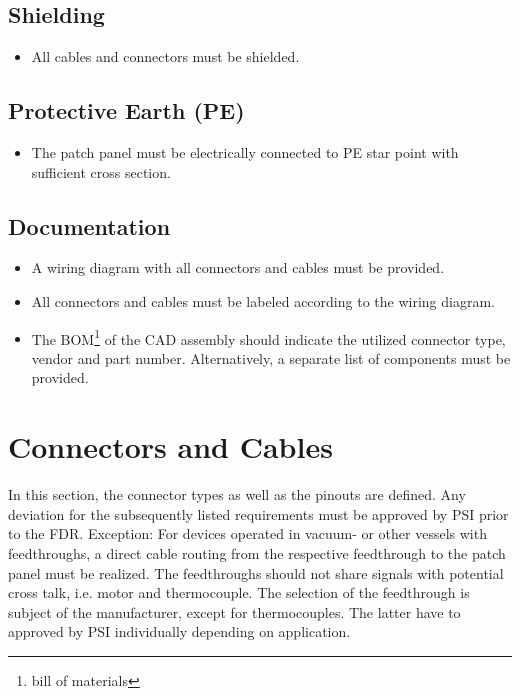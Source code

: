 \documentclass[english]{psi_easy}
\begin{document}
\subsection{Shielding}
\begin{itemize}
    \item All cables and connectors must be shielded.
\end{itemize}

\subsection{Protective Earth (PE)}
\begin{itemize}
    \item The patch panel must be electrically connected to PE star point with sufficient cross section.
\end{itemize}

\subsection{Documentation}
\begin{itemize}
    \item A wiring diagram with all connectors and cables must be provided.
    \item All connectors and cables must be labeled according to the wiring diagram.
    \item The BOM\footnote{bill of materials} of the CAD assembly should indicate the utilized connector type, vendor and part number. Alternatively, a separate list of components must be provided.
\end{itemize}

\section{Connectors and Cables}

In this section, the connector types as well as the pinouts are defined.
Any deviation for the subsequently listed requirements must be approved by PSI prior to the FDR.
Exception: For devices operated in vacuum- or other vessels with feedthroughs, a direct cable routing from the respective feedthrough to the patch panel must be realized.
The feedthroughs should not share signals with potential cross talk, i.e. motor and thermocouple.
The selection of the feedthrough is subject of the manufacturer, except for thermocouples.
The latter have to approved by PSI individually depending on application.
\end{document}
